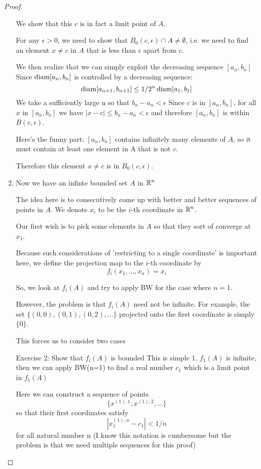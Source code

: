 \begin{proof}
\begin{enumerate}[label=(\alph*)]
We show that this $c$ is in fact a limit point of $A$.

For any $\epsilon>0$, we need to show that $B_0(c,\epsilon) \cap A \neq \emptyset$, i.e. we need to find an element $x \neq c$ in $A$ that is less than $\epsilon$ apart from $c$.

We then realize that we can simply exploit the decreasing sequence $[a_n,b_n]$
Since $\operatorname{diam} [a_n,b_n]$ is controlled by a decreasing sequence:
\[ \operatorname{diam} [a_{n+1},b_{n+1}] \le 1/2^n \operatorname{diam} [a_1,b_1] \]
We take a sufficiently large n so that $b_n-a_n<\epsilon$
Since $c$ is in $[a_n,b_n]$, for all $x$ in $[a_n,b_n]$ we have $|x-c|\le b_n-a_n<\epsilon$ and therefore $[a_n,b_n]$ is within $B(c,\epsilon)$.

Here's the funny part: $[a_n,b_n]$ contains infinitely many elements of $A$, so it must contain at least one element in A that is not $c$.

Therefore this element $x \neq c$ is in $B_0(c,\epsilon)$.

\item Now we have an infinte bounded set $A$ in $\mathbb R^n$

The idea here is to consecutively come up with better and better sequences of points in $A$. We denote $x_i$ to be the $i$-th coordinate in $\mathbb R^n$.

Our first wish is to pick some elements in $A$ so that they sort of converge at $x_1$.

Because such considerations of 'restricting to a single coordinate' is important here, we define the projection map to the $i$-th coordinate by
\[ f_i(x_1,\dots,x_n)=x_i \]

So, we look at $f_i(A)$ and try to apply BW for the case where $n=1$.

However, the problem is that $f_i(A)$ need not be infinite. For example, the set $\{(0,0),(0,1),(0,2),\dots\}$ projected onto the first coordinate is simply $\{0\}$.

This forces us to consider two cases

Exercise 2: Show that $f_i(A)$ is bounded
This is simple
1. $f_1(A)$ is infinite, then we can apply BW(n=1) to find a real number $c_1$ which is a limit point in $f_1(A)$

Here we can construct a sequence of points 
\[ \{x^{(1),1},x^{(1),2},...\} \]
so that their first coordinates satisfy
\[ |x^{(1),n}_1-c_1| < 1/n \]
for all natural number n
(I know this notation is cumbersome but the problem is that we need multiple sequences for this proof)


\end{enumerate}
\end{proof}

